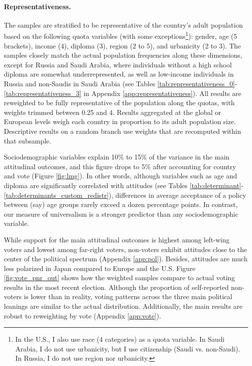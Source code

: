 \documentclass[12pt,english]{article}
\begin{document}
\begin{bibunit}
\paragraph{Representativeness.}\label{par:representativeness}
The samples are stratified to be representative of the country's adult population based on the following quota variables (with some exceptions\footnote{In the U.S., I also use race (4 categories) as a quota variable. In Saudi Arabia, I do not use urbanicity, but I use citizenship (Saudi vs. non-Saudi). In Russia, I do not use region nor urbanicity.}): 
gender, age (5 brackets), income (4), diploma (3), region (2 to 5), and urbanicity (2 to 3). The samples closely match the actual population frequencies along these dimensions, except for Russia and Saudi Arabia, where individuals without a high school diploma are somewhat underrepresented, as well as low-income individuals in Russia and non-Saudis in Saudi Arabia (see Tables \ref{tab:representativeness_0}-\ref{tab:representativeness_3} in Appendix \ref{app:representativeness}). All results are reweighted to be fully representative of the population along the quotas, with weights trimmed between 0.25 and 4. Results aggregated at the global or European levels weigh each country in proportion to its adult population size. Descriptive results on a random branch use weights that are recomputed within that subsample.

Sociodemographic variables explain 10\% to 15\% of the variance in the main attitudinal outcomes, and this figure drops to 5\% after accounting for country and vote (Figure \ref{fig:lmg}). In other words, although variables such as age and diploma are significantly correlated with attitudes (see Tables \ref{tab:determinant}-\ref{tab:determinants_custom_redistr}), differences in average acceptance of a policy between (say) age groups rarely exceed a dozen percentage points. In contrast, our measure of universalism is a stronger predictor than any sociodemographic variable. %

While support for the main attitudinal outcomes 
is highest among left-wing voters and lowest among far-right voters, non-voters exhibit attitudes close to the center of the political spectrum (Appendix \ref{app:pol}). Besides, attitudes are much less polarized in Japan compared to Europe and the U.S. 
Figure \ref{fig:vote_pnr_out} shows 
how the weighted samples compare to actual voting results in the most recent election. 
Although the proportion of self-reported non-voters is lower than in reality, voting patterns across the three main political leanings are similar to the actual distribution. 
Additionally, the main results are robust to reweighting by vote (Appendix \ref{app:vote}). 


\end{bibunit}
\end{document}
